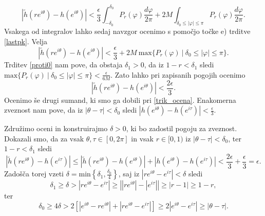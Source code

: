 \documentclass[mat1, tisk]{fmfdelo}
\begin{document}
\begin{dokaz}
        $$
        \left|\widetilde{h}(re^{i\theta}) - h(e^{i\theta})\right| < \frac{\epsilon}{3} \int_{-\delta_0}^{\delta_0}{P_r(\varphi) \frac{d\varphi}{2\pi}} + 2M\int_{\delta_0 \leq |\varphi| \leq \pi}{P_r(\varphi)\frac{d\varphi}{2\pi}}.
        $$
        Vsakega od integralov lahko sedaj navzgor ocenimo s pomočjo točke e) trditve \ref{lastpk}. Velja
        $$
        \left|\widetilde{h}(re^{i\theta}) - h(e^{i\theta})\right| < \frac{\epsilon}{3}  + 2M~\text{max}\{P_r(\varphi)~| ~\delta_0 \leq |\varphi| \leq \pi \}.
        $$
        Trditev \ref{proti0} nam pove, da obstaja $\delta_1 >0$, da iz $1 - r < \delta_1$ sledi $\text{max}\{P_r(\varphi)~| ~\delta_0 \leq |\varphi| \leq \pi \} < \frac{\epsilon}{6M}$.
        Zato lahko pri zapisanih pogojih ocenimo
        $$
        \left|\widetilde{h}(re^{i\theta}) - h(e^{i\theta})\right| < \frac{2 \epsilon}{3}.
        $$
        Ocenimo še drugi sumand, ki smo ga dobili pri \eqref{trik_ocena}. Enakomerna zveznost nam pove, da iz $|\theta - \tau| < \delta_0$ sledi $|h\left(e^{i\theta}\right) - h\left(e^{i\tau}\right)| < \frac{\epsilon}{3}$.
        
        Združimo oceni in konstruirajmo $\delta>0$, ki bo zadostil pogoju za zveznost. Dokazali smo, da za vsak $\theta, \tau \in [0,2\pi]$ in vsak $r \in [0,1)$ iz $|\theta - \tau| < \delta_0$, ter $1- r < \delta_1$ sledi
        $$
        \left|\widetilde{h}(r e^{i \theta}) - h(e^{i\tau})\right| \leq \left|\widetilde{h}(re^{i\theta}) - h(e^{i\theta})\right| + \left|h\left(e^{i\theta}\right) - h\left(e^{i\tau}\right)\right| < \frac{2 \epsilon}{3} + \frac{\epsilon}{3} = \epsilon.
        $$
        Zadošča torej vzeti $\delta = \text{min}\left\{\delta_1, \frac{\delta_0}{4}\right\}$, saj iz $|r e^{i \theta} - e^{i\tau}| < \delta$ sledi
        $$ 
            \delta_1 \geq \delta > |r e^{i \theta} - e^{i\tau}| \geq \left||r e^{i \theta}| - |e^{i\tau}|\right| \geq |r - 1| \geq 1 -r, 
        $$
        ter
        $$ 
            \delta_0 \geq 4 \delta > 2 \left[\left| e^{i \theta} - r e^{i\theta} \right| +  \left|r e^{i\theta} - e^{i\tau} \right| \right] \geq 2 \left|e^{i\theta} - e^{i\tau} \right| \geq |\theta - \tau|.
        $$
    \end{dokaz}
\end{document}
